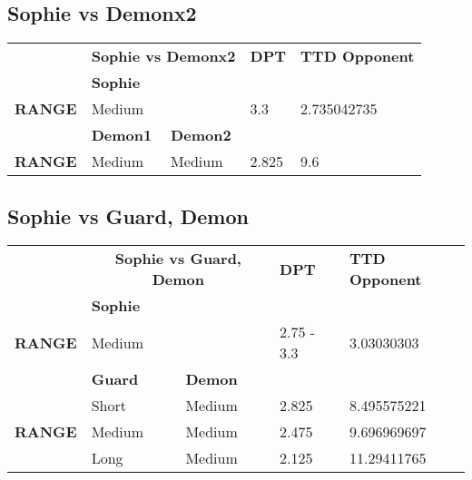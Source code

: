 \subsection{Sophie vs Demonx2}
\begin{table}[H]
  \centering
\begin{tabular}{ll|l|l|l|}
\cline{2-5}
\multicolumn{1}{l|}{} & \multicolumn{2}{c|}{\cellcolor[HTML]{C0C0C0}\textbf{Sophie vs Demonx2}} & \cellcolor[HTML]{C0C0C0}\textbf{DPT} & \cellcolor[HTML]{C0C0C0}\textbf{TTD Opponent} \\ \cline{2-5} 
\multicolumn{1}{l|}{\textbf{}} & \multicolumn{2}{l|}{\textbf{Sophie}} & \multicolumn{2}{l|}{} \\ \hline
\multicolumn{1}{|l|}{\cellcolor[HTML]{C0C0C0}\textbf{RANGE}} & \multicolumn{2}{l|}{Medium} & 3.3 & 2.735042735 \\ \hline
\multicolumn{1}{l|}{} & \textbf{Demon1} & \textbf{Demon2} & \multicolumn{2}{l|}{} \\ \hline
\multicolumn{1}{|l|}{\cellcolor[HTML]{C0C0C0}\textbf{RANGE}} & Medium & Medium & 2.825 & 9.6 \\ \hline
\end{tabular}
\end{table}

\subsection{Sophie vs Guard, Demon}
\begin{table}[H]
  \centering
\begin{tabular}{ll|l|l|l|}
\cline{2-5}
\multicolumn{1}{l|}{} & \multicolumn{2}{c|}{\cellcolor[HTML]{C0C0C0}\textbf{Sophie vs Guard, Demon}} & \cellcolor[HTML]{C0C0C0}\textbf{DPT} & \cellcolor[HTML]{C0C0C0}\textbf{TTD Opponent} \\ \cline{2-5} 
\multicolumn{1}{l|}{\textbf{}} & \multicolumn{2}{l|}{\textbf{Sophie}} & \multicolumn{2}{l|}{} \\ \hline
\multicolumn{1}{|l|}{\cellcolor[HTML]{C0C0C0}\textbf{RANGE}} & \multicolumn{2}{l|}{Medium} & 2.75 - 3.3 & 3.03030303 \\ \hline
\multicolumn{1}{l|}{} & \textbf{Guard} & \textbf{Demon} & \multicolumn{2}{l|}{} \\ \hline
\multicolumn{1}{|l|}{\cellcolor[HTML]{C0C0C0}} & Short & Medium & 2.825 & 8.495575221 \\ \cline{2-5} 
\multicolumn{1}{|l|}{\cellcolor[HTML]{C0C0C0}\textbf{RANGE}} & Medium & Medium & 2.475 & 9.696969697 \\ \cline{2-5} 
\multicolumn{1}{|l|}{\cellcolor[HTML]{C0C0C0}} & Long & Medium & 2.125 & 11.29411765 \\ \hline
\end{tabular}
\end{table}
